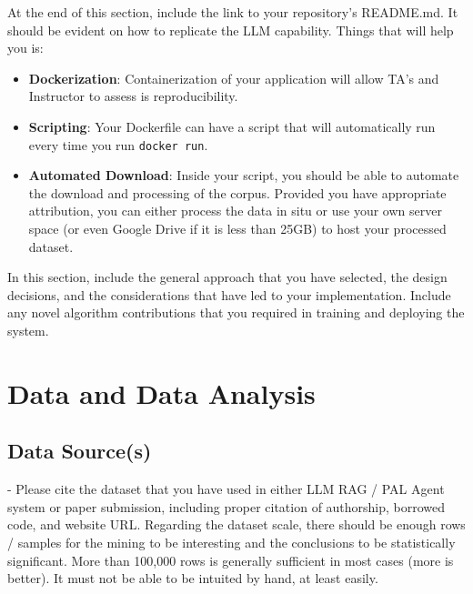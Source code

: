 \documentclass[paper=a4, fontsize=11pt]{scrartcl} %
\begin{document}
At the end of this section, include the link to your repository's README.md. It should be evident on how to replicate the LLM capability. Things that will help you is:

\begin{itemize}
    \item \textbf{Dockerization}: Containerization of your application will allow TA's and Instructor to assess is reproducibility.
    \item \textbf{Scripting}: Your Dockerfile can have a script that will automatically run every time you run \verb"docker run".
    \item \textbf{Automated Download}: Inside your script, you should be able to automate the download and processing of the corpus. Provided you have appropriate attribution, you can either process the data in situ or use your own server space (or even Google Drive if it is less than 25GB) to host your processed dataset.
\end{itemize}

In this section, include the general approach that you have selected, the design decisions, and the considerations that have led to your implementation. Include any novel algorithm contributions that you required in training and deploying the system. \\




\section{Data and Data Analysis}

\subsection{Data Source(s)} - Please cite the dataset that you have used in either LLM RAG / PAL Agent system or paper submission, including proper citation of authorship, borrowed code, and website URL. Regarding the dataset scale, there should be enough rows / samples for the mining to be interesting and the conclusions to be statistically significant. More than 100,000 rows is generally sufficient in most cases (more is better). It must not be able to be intuited by hand, at least easily. \\
\end{document}
